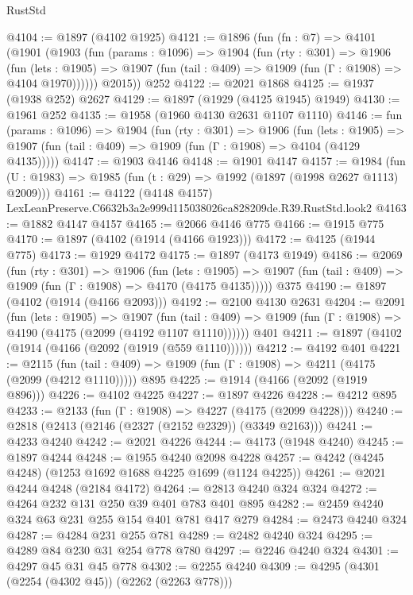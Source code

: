 \begin{lexlean}{RustStd}
\begin{coremodule}
@4104 := @1897 (@4102 @1925)
@4121 := @1896
    (fun (fn : @7) =>
    @4101
      (@1901
        (@1903
          (fun (params : @1096) =>
          @1904
            (fun (rty : @301) =>
            @1906
              (fun (lets : @1905) =>
              @1907 (fun (tail : @409) => @1909 (fun (Γ : @1908) => @4104 @1970))))))
        @2015))
    @252
@4122 := @2021 @1868
@4125 := @1937 (@1938 @252) @2627
@4129 := @1897 (@1929 (@4125 @1945) @1949)
@4130 := @1961 @252
@4135 := @1958 (@1960 @4130 @2631 @1107 @1110)
@4146 := fun (params : @1096) =>
  @1904
    (fun (rty : @301) =>
    @1906
      (fun (lets : @1905) =>
      @1907 (fun (tail : @409) => @1909 (fun (Γ : @1908) => @4104 (@4129 @4135)))))
@4147 := @1903 @4146
@4148 := @1901 @4147
@4157 := @1984 (fun (U : @1983) => @1985 (fun (t : @29) => @1992 (@1897 (@1998 @2627 @1113) @2009)))
@4161 := @4122 (@4148 @4157) LexLeanPreserve.C6632b3a2e999d115038026ca828209de.R39.RustStd.look2
@4163 := @1882 @4147 @4157
@4165 := @2066 @4146 @775
@4166 := @1915 @775
@4170 := @1897 (@4102 (@1914 (@4166 @1923)))
@4172 := @4125 (@1944 @775)
@4173 := @1929 @4172
@4175 := @1897 (@4173 @1949)
@4186 := @2069
    (fun (rty : @301) =>
    @1906
      (fun (lets : @1905) =>
      @1907 (fun (tail : @409) => @1909 (fun (Γ : @1908) => @4170 (@4175 @4135)))))
    @375
@4190 := @1897 (@4102 (@1914 (@4166 @2093)))
@4192 := @2100 @4130 @2631
@4204 := @2091
    (fun (lets : @1905) =>
    @1907
      (fun (tail : @409) => @1909 (fun (Γ : @1908) => @4190 (@4175 (@2099 (@4192 @1107 @1110))))))
    @401
@4211 := @1897 (@4102 (@1914 (@4166 (@2092 (@1919 (@559 @1110))))))
@4212 := @4192 @401
@4221 := @2115
    (fun (tail : @409) => @1909 (fun (Γ : @1908) => @4211 (@4175 (@2099 (@4212 @1110)))))
    @895
@4225 := @1914 (@4166 (@2092 (@1919 @896)))
@4226 := @4102 @4225
@4227 := @1897 @4226
@4228 := @4212 @895
@4233 := @2133 (fun (Γ : @1908) => @4227 (@4175 (@2099 @4228)))
@4240 := @2818 (@2413 (@2146 (@2327 (@2152 @2329)) (@3349 @2163)))
@4241 := @4233 @4240
@4242 := @2021 @4226
@4244 := @4173 (@1948 @4240)
@4245 := @1897 @4244
@4248 := @1955 @4240 @2098 @4228
@4257 := @4242 (@4245 @4248) (@1253 @1692 @1688 @4225 @1699 (@1124 @4225))
@4261 := @2021 @4244 @4248 (@2184 @4172)
@4264 := @2813 @4240 @324 @324
@4272 := @4264 @232 @131 @250 @39 @401 @783 @401 @895
@4282 := @2459 @4240 @324 @63 @231 @255 @154 @401 @781 @417 @279
@4284 := @2473 @4240 @324
@4287 := @4284 @231 @255 @781
@4289 := @2482 @4240 @324
@4295 := @4289 @84 @230 @31 @254 @778 @780
@4297 := @2246 @4240 @324
@4301 := @4297 @45 @31 @45 @778
@4302 := @2255 @4240
@4309 := @4295 (@4301 (@2254 (@4302 @45)) (@2262 (@2263 @778)))

\end{coremodule}
\end{lexlean}
